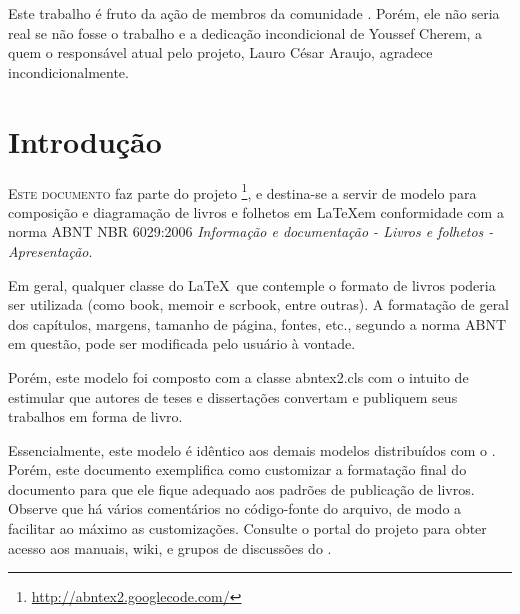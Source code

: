 \documentclass[
	10pt,				%
	openright,			%
	twoside,			%
	a5paper,			%
	english,			%
	french,				%
	spanish,			%
	brazil,				%
	sumario=tradicional
]{abntex2}
\renewcommand{\textual}{%
  \pagestyle{abntbookheadings}%
  \aliaspagestyle{chapter}{abntbookchapfirst}%
  \nouppercaseheads%
  \bookmarksetup{startatroot}%
}
\begin{document}
\begin{agradecimentos}
Este trabalho é fruto da ação de membros da comunidade \abnTeX. Porém, ele não
seria real se não fosse o trabalho e a dedicação incondicional de Youssef
Cherem, a quem o responsável atual pelo projeto, Lauro César Araujo, agradece
incondicionalmente.
\end{agradecimentos}

\listoffigures*
\cleardoublepage

\listoftables*
\cleardoublepage

\tableofcontents*
\cleardoublepage

\mainmatter

\chapter*[Introdução]{Introdução}

\lettrine[nindent=0.35em,lhang=0.40,loversize=0.3]{E}{ste documento} faz parte
do projeto \abnTeX\footnote{\url{http://abntex2.googlecode.com/}}, e destina-se
a servir de modelo para composição e diagramação de livros e folhetos em
\LaTeX em conformidade com a norma ABNT NBR 6029:2006 \emph{Informação e
documentação - Livros e folhetos - Apresentação}. 

Em geral, qualquer classe do \LaTeX\ que contemple o formato de livros poderia
ser utilizada (como \textsf{book}, \textsf{memoir} e \textsf{scrbook}, entre
outras). A formatação de geral dos capítulos, margens, tamanho de página,
fontes, etc., segundo a norma ABNT em questão, pode ser modificada pelo usuário
à vontade.

Porém, este modelo foi composto com a classe \textsf{abntex2.cls} com o intuito
de estimular que autores de teses e dissertações convertam e publiquem seus
trabalhos em forma de livro. 

Essencialmente, este modelo é idêntico aos demais modelos distribuídos com o
\abnTeX. Porém, este documento exemplifica como customizar a formatação final do
documento para que ele fique adequado aos padrões de publicação de livros.
Observe que há vários comentários no código-fonte do arquivo, de modo a
facilitar ao máximo as customizações. Consulte o portal do projeto para obter
acesso aos manuais, wiki, e grupos de discussões do \abnTeX.
\end{document}
